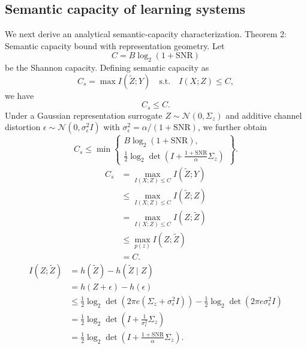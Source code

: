\documentclass[10pt,journal]{IEEEtran}
\begin{document}
\subsection{Semantic capacity of learning systems}
We next derive an analytical semantic-capacity characterization.
Theorem 2: Semantic capacity bound with representation geometry.
Let
\begin{equation}
C = B\log_2(1+\mathrm{SNR})
\end{equation}
be the Shannon capacity. Defining semantic capacity as
\begin{equation}
C_s = \max I(\tilde{Z};Y)
\quad
\text{s.t.}
\quad
I(X;Z)\le C,
\end{equation}
we have
\begin{equation}
C_s \le C.
\end{equation}
Under a Gaussian representation surrogate $Z\sim\mathcal{N}(0,\Sigma_z)$ and additive channel distortion $\epsilon\sim\mathcal{N}(0,\sigma_\epsilon^2 I)$ with $\sigma_\epsilon^2=\alpha/(1+\mathrm{SNR})$, we further obtain
\begin{equation}
C_s
\le
\min\left\{
\begin{array}{l}
B\log_2(1+\mathrm{SNR}), \\
\frac{1}{2}\log_2\det\left(I + \frac{1+\mathrm{SNR}}{\alpha}\Sigma_z\right)
\end{array}
\right\}.
\end{equation}
\begin{equation}
\begin{aligned}
C_s
&=
\max_{I(X;Z)\le C} I(\tilde{Z};Y) \\
&\le
\max_{I(X;Z)\le C} I(\tilde{Z};Z) \\
&=
\max_{I(X;Z)\le C} I(Z;\tilde{Z}) \\
&\le
\max_{p(z)} I(Z;\tilde{Z}) \\
&=
C.
\end{aligned}
\end{equation}
\begin{equation}
\begin{aligned}
I(Z;\tilde{Z})
&= h(\tilde{Z}) - h(\tilde{Z}\mid Z) \\
&= h(Z+\epsilon)-h(\epsilon) \\
&\le
\frac{1}{2}\log_2\det\left(2\pi e(\Sigma_z+\sigma_\epsilon^2 I)\right)
-
\frac{1}{2}\log_2\det\left(2\pi e\sigma_\epsilon^2 I\right) \\
&=
\frac{1}{2}\log_2\det\left(I+\frac{1}{\sigma_\epsilon^2}\Sigma_z\right) \\
&=
\frac{1}{2}\log_2\det\left(I+\frac{1+\mathrm{SNR}}{\alpha}\Sigma_z\right).
\end{aligned}
\end{equation}
\end{document}
